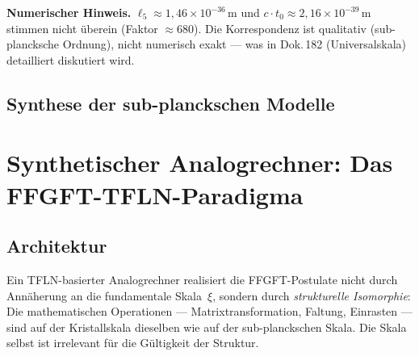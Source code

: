 \begin{warnbox}
\textbf{Numerischer Hinweis.}
$\ell_5 \approx 1{,}46 \times 10^{-36}\,\text{m}$ und
$c\cdot t_0 \approx 2{,}16 \times 10^{-39}\,\text{m}$
stimmen nicht überein (Faktor $\approx 680$).
Die Korrespondenz ist qualitativ (sub-plancksche Ordnung), nicht numerisch
exakt — was in Dok.\,182 (Universalskala) detailliert diskutiert wird.
\end{warnbox}

\subsection{Synthese der sub-planckschen Modelle}

\begin{table}[H]
\centering
\caption{Vergleich sub-planckscher Modelle}
\smallskip
{}
\end{table}

\section{Synthetischer Analogrechner: Das FFGFT-TFLN-Paradigma}

\subsection{Architektur}

Ein TFLN-basierter Analogrechner realisiert die FFGFT-Postulate nicht
durch Annäherung an die fundamentale Skala~$\xi$, sondern durch
\emph{strukturelle Isomorphie}: Die mathematischen Operationen —
Matrixtransformation, Faltung, Einrasten — sind auf der Kristallskala
dieselben wie auf der sub-planckschen Skala. Die Skala selbst ist
irrelevant für die Gültigkeit der Struktur.

